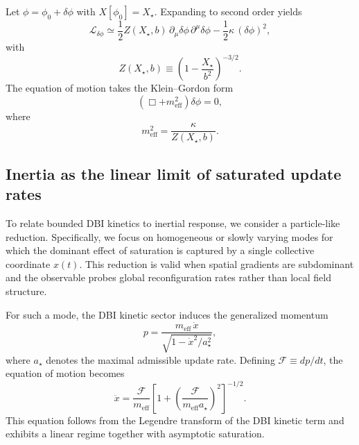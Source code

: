 \documentclass[pdflatex,sn-mathphys-num]{sn-jnl} %
\theoremstyle{remark}
\begin{document}
  Let $\phi=\phi_0+\delta\phi$ with $X[\phi_0]=X_{\star}$.
  Expanding to second order yields
  \begin{equation}
    \mathcal{L}_{\delta\phi}
    \simeq
    \frac{1}{2}Z(X_{\star},b)\,
    \partial_{\mu}\delta\phi\,\partial^{\mu}\delta\phi
    - \frac{1}{2}\kappa\,(\delta\phi)^2,
  \end{equation}
  with
  \begin{equation}
    Z(X_{\star},b)
    \equiv \left(1-\frac{X_{\star}}{b^2}\right)^{-3/2}.
  \end{equation}
  The equation of motion takes the Klein--Gordon form
  \begin{equation}
    \left(\Box + m_{\mathrm{eff}}^2\right)\delta\phi = 0,
    \label{eq:kg_effective}
  \end{equation}
  where
  \begin{equation}
    m_{\mathrm{eff}}^2 = \frac{\kappa}{Z(X_{\star},b)}.
    \label{eq:meff_general}
  \end{equation}

  \subsection{Inertia as the linear limit of saturated update rates}
  \label{subsec:inertia_update}

  To relate bounded DBI kinetics to inertial response, we consider a particle-like reduction.
  Specifically, we focus on homogeneous or slowly varying modes for which the dominant effect
  of saturation is captured by a single collective coordinate $x(t)$.
  This reduction is valid when spatial gradients are subdominant and the observable probes
  global reconfiguration rates rather than local field structure.

  For such a mode, the DBI kinetic sector induces the generalized momentum
  \begin{equation}
    p = \frac{m_{\mathrm{eff}}\,\dot{x}}{\sqrt{1-\dot{x}^2/a_{\star}^2}},
  \end{equation}
  where $a_{\star}$ denotes the maximal admissible update rate.
  Defining $\mathcal{F}\equiv dp/dt$, the equation of motion becomes
  \begin{equation}
    \ddot{x}
    = \frac{\mathcal{F}}{m_{\mathrm{eff}}}
    \left[
      1+\left(\frac{\mathcal{F}}{m_{\mathrm{eff}}a_{\star}}\right)^2
    \right]^{-1/2}.
    \label{eq:dynamical_derivation}
  \end{equation}
  This equation follows from the Legendre transform of the DBI kinetic term and exhibits a
  linear regime together with asymptotic saturation.
\end{document}
